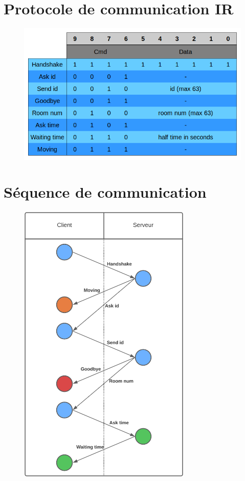\appendix
\parskip=0cm
\chapter{Protocole de communication IR}
\label{app:protocol}

\begin{figure}[h]
  \centering
  \includegraphics[width=\textwidth]{code/protocol}
\end{figure}

\chapter{Séquence de communication}
\label{app:communication}

\begin{figure}[h]
  \centering
  \includegraphics[height=13.7cm]{code/communication}
\end{figure}

